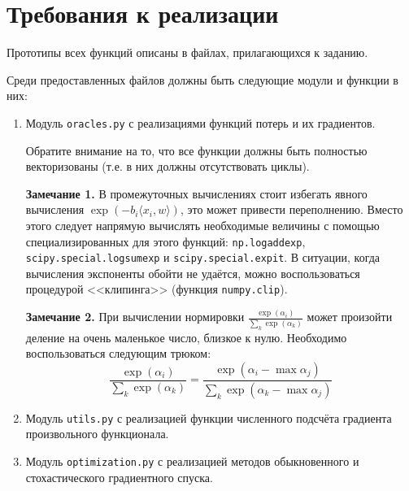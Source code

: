\documentclass[10pt,fleqn]{article}
\begin{document}
\section*{Требования к реализации}
\label{requirments}

Прототипы всех функций описаны в файлах, прилагающихся к заданию.

Среди предоставленных файлов должны быть следующие модули и функции в них:

\begin{enumerate}

\item Модуль \texttt{oracles.py} с реализациями функций потерь и их градиентов.

 Обратите внимание на то, что все функции должны быть полностью векторизованы (т.е. в них должны отсутствовать циклы).

\textbf{Замечание 1.} В промежуточных вычислениях стоит избегать явного вычисления $\exp(-b_i \langle x_i , w\rangle)$, это может привести переполнению. Вместо этого следует напрямую вычислять необходимые величины с помощью специализированных для этого функций: \texttt{np.logaddexp}, \texttt{scipy.special.logsumexp} и \texttt{scipy.special.expit}.
В ситуации, когда вычисления экспоненты обойти не удаётся, можно воспользоваться процедурой <<клипинга>> (функция \texttt{numpy.clip}).

\textbf{Замечание 2.} При вычислении нормировки $\frac{\exp(\alpha_i)}{\sum_{k}\exp(\alpha_k)}$ может произойти деление на очень маленькое число, близкое к нулю. Необходимо воспользоваться следующим трюком:
$$
\frac{\exp(\alpha_i)}{\sum_{k}\exp(\alpha_k)} = \frac{\exp(\alpha_i - \max \alpha_j)}{\sum_{k}\exp(\alpha_k - \max \alpha_j)}
$$

\item Модуль \texttt{utils.py} с реализацией функции численного подсчёта градиента произвольного функционала.

\item Модуль \texttt{optimization.py} с реализацией методов обыкновенного и стохастического градиентного спуска.

\end{enumerate}
\end{document}
